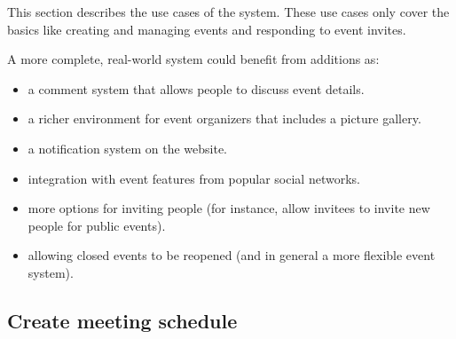 \label{sec:usecases}
This section describes the use cases of the system. These use cases only cover the basics like creating and managing events and responding to event invites.

A more complete, real-world system could benefit from additions as:
\begin{itemize}
	\item a comment system that allows people to discuss event details.
	\item a richer environment for event organizers that includes a picture gallery.
	\item a notification system on the website.
	\item integration with event features from popular social networks.
	\item more options for inviting people (for instance, allow invitees to invite new people for public events).
	\item allowing closed events to be reopened (and in general a more flexible event system).
\end{itemize}

\subsection{Create meeting schedule}

